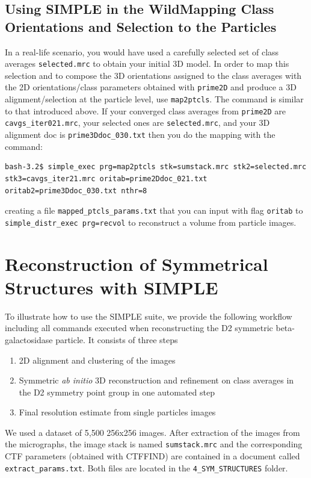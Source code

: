 \documentclass[a4paper,11pt]{article}
\newcommand{\prgname}[1]{\textcolor{NavyBlue}{\texttt{#1}}}
\begin{document}
\begin{tcolorbox}[breakable,colback=white,colframe=orange,width=\dimexpr\textwidth+12mm\relax,enlarge left by=-6mm]
\subsection{Using SIMPLE in the Wild\textemdash{}Mapping Class Orientations and Selection to the Particles}
In a real-life scenario, you would have used a carefully selected set of class averages \texttt{selected.mrc} to obtain your initial 3D model. In order to map this selection and to compose the 3D orientations assigned to the class averages with the 2D orientations/class parameters obtained with \prgname{prime2D} and produce a 3D alignment/selection at the particle level, use \prgname{map2ptcls}. The command is similar to that introduced above. If your converged class averages from \prgname{prime2D} are \texttt{cavgs\_iter021.mrc}, your selected ones are \texttt{selected.mrc}, and your 3D alignment doc is \texttt{prime3Ddoc\_030.txt} then you do the mapping with the command:
\begin{verbatim}
bash-3.2$ simple_exec prg=map2ptcls stk=sumstack.mrc stk2=selected.mrc
stk3=cavgs_iter21.mrc oritab=prime2Ddoc_021.txt oritab2=prime3Ddoc_030.txt nthr=8
\end{verbatim}
creating a file \texttt{mapped\_ptcls\_params.txt} that you can input with flag \texttt{oritab} to \texttt{simple\_distr\_exec prg=recvol} to reconstruct a volume from particle images.
\end{tcolorbox}

\section{Reconstruction of Symmetrical Structures with SIMPLE}
To illustrate how to use the SIMPLE suite, we provide the following workflow including all commands executed when reconstructing the D2 symmetric beta-galactosidase particle. It consists of three steps
\begin{enumerate}
\item 2D alignment and clustering of the images
\item Symmetric \textit{ab initio} 3D reconstruction and refinement on class averages in the D2 symmetry point group in one automated step
\item Final resolution estimate from single particles images
\end{enumerate}
We used a dataset of 5,500 256x256 images. After extraction of the images from the micrographs, the image stack is named \texttt{sumstack.mrc} and the corresponding CTF parameters (obtained with CTFFIND) are contained in a document called \texttt{extract\_params.txt}. Both files are located in the \texttt{4\_SYM\_STRUCTURES} folder.
\end{document}
